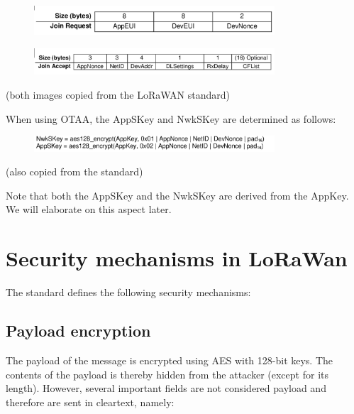\begin{figure}[h!]
{\includegraphics[width=0.8\textwidth]{images/image16.png}}
\end{figure}

\begin{figure}[h!]
{\includegraphics[width=0.8\textwidth]{images/image6.png}}
\end{figure}

{(both images copied from the LoRaWAN standard)}


{When using OTAA, the AppSKey and NwkSKey are determined as follows:}

\begin{figure}[h!]
{\includegraphics[width=0.8\textwidth]{images/image4.png}}
\end{figure}

{(also copied from the standard)}

{Note that both the AppSKey and the NwkSKey are derived from the AppKey.
We will elaborate on this aspect later.}

\section{Security mechanisms in LoRaWan}

{The standard defines the following security mechanisms:}

\subsection{Payload encryption}

{The payload of the message is encrypted using AES with 128-bit keys.
The contents of the payload is thereby hidden from the attacker (except
for its length). However, several important fields are
not considered payload and therefore are sent in cleartext, namely:}

